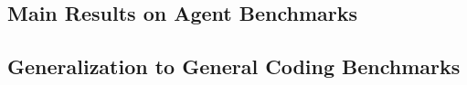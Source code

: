 \documentclass{article}
\begin{document}
%
\subsection{Main Results on Agent Benchmarks}
\label{sec:exp:main}



%
\subsection{Generalization to General Coding Benchmarks}
\label{sec:exp:gen}
\end{document}

